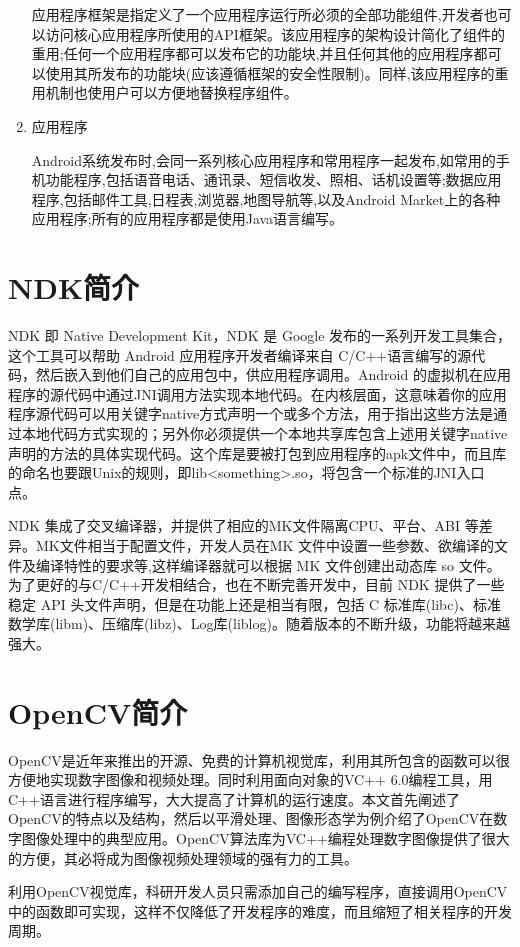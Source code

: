 \documentclass{XDBAthesis}
\begin{document}
\begin{enumerate}
 应用程序框架是指定义了一个应用程序运行所必须的全部功能组件,开发者也可以访问核心应用程序所使用的API框架。该应用程序的架构设计简化了组件的重用;任何一个应用程序都可以发布它的功能块,并且任何其他的应用程序都可以使用其所发布的功能块(应该遵循框架的安全性限制)。同样,该应用程序的重用机制也使用户可以方便地替换程序组件。
    \item 应用程序 

    Android系统发布时,会同一系列核心应用程序和常用程序一起发布,如常用的手机功能程序,包括语音电话、通讯录、短信收发、照相、话机设置等;数据应用程序,包括邮件工具,日程表,浏览器,地图导航等,以及Android Market上的各种应用程序;所有的应用程序都是使用Java语言编写。 
    
\end{enumerate}


\section{NDK简介}

   NDK 即 Native Development Kit，NDK 是 Google 发布的一系列开发工具集合，这个工具可以帮助 Android 应用程序开发者编译来自 C/C++语言编写的源代码，然后嵌入到他们自己的应用包中，供应用程序调用。Android 的虚拟机在应用程序的源代码中通过JNI调用方法实现本地代码。在内核层面，这意味着你的应用程序源代码可以用关键字native方式声明一个或多个方法，用于指出这些方法是通过本地代码方式实现的；另外你必须提供一个本地共享库包含上述用关键字native声明的方法的具体实现代码。这个库是要被打包到应用程序的apk文件中，而且库的命名也要跟Unix的规则，即lib<something>.so，将包含一个标准的JNI入口点。

   NDK 集成了交叉编译器，并提供了相应的MK文件隔离CPU、平台、ABI 等差异。MK文件相当于配置文件，开发人员在MK 文件中设置一些参数、欲编译的文件及编译特性的要求等,这样编译器就可以根据 MK 文件创建出动态库 so 文件。为了更好的与C/C++开发相结合，也在不断完善开发中，目前 NDK 提供了一些稳定 API 头文件声明，但是在功能上还是相当有限，包括 C 标准库(libc)、标准数学库(libm)、压缩库(libz)、Log库(liblog)。随着版本的不断升级，功能将越来越强大。

\section{OpenCV简介}

OpenCV是近年来推出的开源、免费的计算机视觉库，利用其所包含的函数可以很方便地实现数字图像和视频处理。同时利用面向对象的VC++ 6.0编程工具，用C++语言进行程序编写，大大提高了计算机的运行速度。本文首先阐述了OpenCV的特点以及结构，然后以平滑处理、图像形态学为例介绍了OpenCV在数字图像处理中的典型应用。OpenCV算法库为VC++编程处理数字图像提供了很大的方便，其必将成为图像视频处理领域的强有力的工具。

利用OpenCV视觉库，科研开发人员只需添加自己的编写程序，直接调用OpenCV中的函数即可实现，这样不仅降低了开发程序的难度，而且缩短了相关程序的开发周期。


\ifx\allfiles\undefined
%

\end{document}
